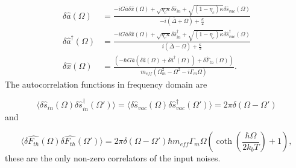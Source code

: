 \begin{align}
\delta\hat{a}(\Omega) & = \frac{-iG\bar{a}\delta\hat{x}(\Omega) + \sqrt{\eta_c\kappa}\delta\hat{s}_{in} + \sqrt{(1 - \eta_c)\kappa}\delta\hat{s}_{vac}(\Omega)}{-i(\bar{\Delta} + \Omega) + \frac{\kappa}{2}} \label{eq:da}\\
\delta\hat{a}^\dagger(\Omega) & = \frac{-iG\bar{a}\delta\hat{x}(\Omega) + \sqrt{\eta_c\kappa}\delta\hat{s}_{in}^\dagger + \sqrt{(1 - \eta_c)\kappa}\delta\hat{s}_{vac}^\dagger(\Omega)}{i(\bar{\Delta} - \Omega) + \frac{\kappa}{2}} \label{eq:dad} \\
\delta\hat{x}(\Omega) & = \frac{\left( -\hbar G\bar{a}(\delta\hat{a}(\Omega) + \delta\hat{a}^\dagger(\Omega)) + \delta\hat{F}_{th}(\Omega) \right)}{m_{eff}(\Omega_m^2 - \Omega^2 - i\Gamma_m\Omega)} \label{eq:dx}.
\end{align}
\noindent
The autocorrelation functions in frequency domain are

\begin{equation}
\langle \delta\hat{s}_{in}(\Omega)\delta\hat{s}_{in}^\dagger(\Omega') \rangle = \langle \delta\hat{s}_{vac}(\Omega)\delta\hat{s}_{vac}^\dagger(\Omega') \rangle = 2\pi\delta(\Omega - \Omega')
\end{equation}
\noindent
and

\begin{equation}
\langle \delta\hat{F_{th}}(\Omega)\delta\hat{F_{th}}(\Omega') \rangle = 2\pi\delta(\Omega - \Omega')\hbar m_{eff}\Gamma_m\Omega\left( \coth\left( \frac{\hbar\Omega}{2k_bT} \right) + 1\right),
\end{equation}
\noindent
these are the only non-zero correlators of the input noises.